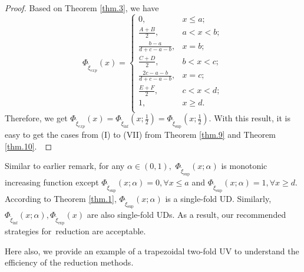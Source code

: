 \begin{proof}
	Based on Theorem \ref{thm.3}, we have 
	\[\Phi_{\tilde{\xi}_{exp}}(x)=\left\{
	\begin{array}{ll}
		0, & x\leq a;\\
		\frac{A+B}{2}, &  a<x<b;\\
		\frac{b-a}{d+c-a-b}, &  x=b;\\
		\frac{C+D}{2}, &  b<x<c;\\
		\frac{2c-a-b}{d+c-a-b}, &  x=c;\\
		\frac{E+F}{2}, &  c<x<d;\\
		1, &  x\geq d.\\
	\end{array}
	\right.
	\] 
	Therefore, we get $\Phi_{\tilde{\xi}_{exp}}(x)=\Phi_{\tilde{\xi}_{\inf}}(x;\frac{1}{2})=\Phi_{\tilde{\xi}_{\sup}}(x;	\frac{1}{2})$. With this result, it is easy to get the cases from (I) to (VII) from Theorem \ref{thm.9} and Theorem \ref{thm.10}. 
\end{proof}
\begin{remark}
	Similar to earlier remark, for any $\alpha\in(0,1),$ $\Phi_{\tilde{\xi}_{\sup}}(x;\alpha)$ is monotonic increasing function except $\Phi_{\tilde{\xi}_{\sup}}(x;\alpha)=0,\forall x\leq a$ and $\Phi_{\tilde{\xi}_{\sup}}(x;\alpha)=1, \forall x\geq d.$ According to Theorem \ref{thm.1}, $\Phi_{\tilde{\xi}_{\sup}}(x;\alpha)$ is a single-fold UD. Similarly, $\Phi_{\tilde{\xi}_{\inf}}(x;\alpha),\Phi_{\tilde{\xi}_{\exp}}(x)$ are also single-fold UDs. As a result, our recommended strategies for reduction are acceptable.
\end{remark}
\par Here also, we provide an example of a trapezoidal two-fold UV to understand the efficiency of the reduction methods.

